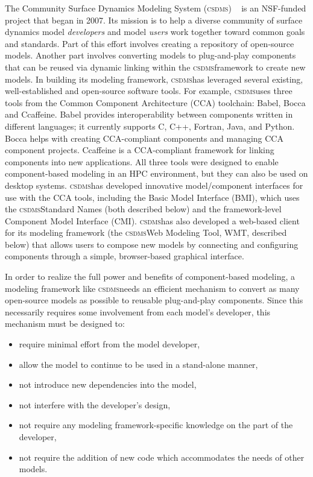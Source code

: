 \documentclass[11pt, oneside]{amsart}
\DeclareRobustCommand{\csdms}{\textsc{csdms}}
\begin{document}
The Community Surface Dynamics Modeling System (\csdms{})
~\cite{peckham2012component}
is an NSF-funded project that began in 2007. Its mission is to help a diverse
community of surface dynamics model \emph{developers} and model \emph{users}
work together toward
common goals and standards. Part of this effort involves creating a repository
of open-source models. Another part involves converting models to plug-and-play
components that can be reused via dynamic linking within the \csdms framework to
create new models. In building its modeling framework, \csdms has leveraged
several existing, well-established and open-source software tools. For example,
\csdms uses three tools from the Common Component Architecture (CCA) toolchain:
Babel, Bocca and Ccaffeine. Babel provides interoperability between components
written in different languages; it currently supports C, C++, Fortran, Java,
and Python. Bocca helps with creating CCA-compliant components and managing CCA
component projects. Ccaffeine is a CCA-compliant framework for linking
components into new applications. All three tools were designed to enable
component-based modeling in an HPC environment, but they can also be used on
desktop systems. \csdms has developed innovative model/component interfaces for
use with the CCA tools, including the Basic Model Interface (BMI), which uses
the \csdms Standard Names (both described below) and the framework-level
Component Model Interface (CMI). \csdms has also developed a web-based client
for its modeling framework (the \csdms Web Modeling Tool, WMT, described below)
that allows users to compose new models by connecting and configuring
components through a simple, browser-based graphical interface.

In order to realize the full power and benefits of component-based modeling, a
modeling framework like \csdms needs an efficient mechanism to convert as many
open-source models as possible to reusable plug-and-play components. Since this
necessarily requires some involvement from each model's developer, this
mechanism must be designed to:

\begin{itemize}

\item require minimal effort from the model developer,

\item allow the model to continue to be used in a stand-alone manner,

\item not introduce new dependencies into the model,

\item not interfere with the developer's design,

\item not require any modeling framework-specific knowledge on the part of the
      developer,

\item not require the addition of new code which accommodates the needs of
      other models. 

\end{itemize}
\end{document}

